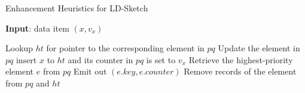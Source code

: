 \begin{algorithm}[t]
\caption{Enhancement Heuristics for LD-Sketch}
\label{alg:heuristic}
\begin{small}
\begin{algorithmic}[1]
\item[{\bf Input}: data item $(x, v_x)$]

  \State Lookup $ht$ for pointer to the corresponding element in $pq$
  \State Update the element in $pq$
\Else
  \EndIf
  \State insert $x$ to $ht$ and its counter in $pq$ is set to $v_x$
\EndIf
\EndFunction
\State
{}
  \State Retrieve the highest-priority element $e$ from $pq$
  \State Emit out $(e.key, e.counter)$
  \State Remove records of the element from $pq$ and $ht$
\EndFunction
\State
{}
  \EndFor
  \EndWhile
\EndProcedure
\end{algorithmic}
\end{small}
\end{algorithm}
